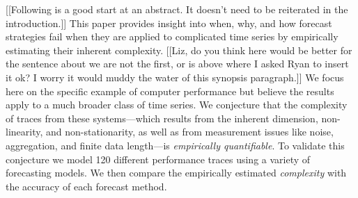 [[Following is a good start at an abstract. It doesn't need to be
    reiterated in the introduction.]]  This paper provides insight
into when, why, and how forecast strategies fail when they are applied
to complicated time series by empirically estimating their inherent
complexity. [[Liz, do you think here would be better for the sentence
    about we are not the first, or is above where I asked Ryan to
    insert it ok? I worry it would muddy the water of this synopsis
    paragraph.]] We focus here on the specific example of computer
performance but believe the results apply to a much broader class of
time series. We conjecture that the complexity of traces from these
systems---which results from the inherent dimension, non-linearity,
and non-stationarity, as well as from measurement issues like noise,
aggregation, and finite data length---is \emph{empirically
  quantifiable}.  To validate this conjecture we model 120 different
performance traces using a variety of forecasting models.  We then
compare the empirically estimated \emph{complexity} with the accuracy
of each forecast method.
